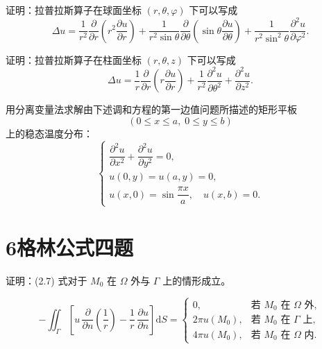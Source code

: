 \begin{homework}[2]
证明：拉普拉斯算子在球面坐标 $(r,\theta,\varphi)$ 下可以写成
\[
\Delta u
=\frac1{r^2}\frac{\partial}{\partial r}\!\left(r^2\frac{\partial u}{\partial r}\right)
+\frac1{r^2\sin\theta}\frac{\partial}{\partial\theta}\!\left(\sin\theta\frac{\partial u}{\partial\theta}\right)
+\frac1{r^2\sin^2\theta}\frac{\partial^2 u}{\partial\varphi^2}.
\]
\end{homework}


\begin{homework}[3]
证明：拉普拉斯算子在柱面坐标 $(r,\theta,z)$ 下可以写成
\[
\Delta u
=\frac1r\frac{\partial}{\partial r}\!\left(r\frac{\partial u}{\partial r}\right)
+\frac1{r^2}\frac{\partial^2 u}{\partial\theta^2}
+\frac{\partial^2 u}{\partial z^2}.
\]
\end{homework}


\begin{homework}[6]
用分离变量法求解由下述调和方程的第一边值问题所描述的矩形平板
\[
(0\le x\le a,\;0\le y\le b)
\]
上的稳态温度分布：
\[
\begin{cases}
\dfrac{\partial^2 u}{\partial x^2}
+\dfrac{\partial^2 u}{\partial y^2}=0,\\[0.6em]
u(0,y)=u(a,y)=0,\\[0.4em]
u(x,0)=\sin\dfrac{\pi x}{a},\quad u(x,b)=0.
\end{cases}
\]
\end{homework}


\section{6格林公式四题}
\begin{homework}[1]
证明：(2.7) 式对于 $M_0$ 在 $\Omega$ 外与 $\Gamma$ 上的情形成立。
\end{homework}
\begin{equation}\tag{2.7}\label{eq:2.7}
 - \iint_{\Gamma}
 \left[
   u\,\frac{\partial}{\partial n}\!\left(\frac{1}{r}\right)
   - \frac{1}{r}\,\frac{\partial u}{\partial n}
 \right]\mathrm{d}S
 =
 \begin{cases}
   0, & \text{若 } M_0 \text{ 在 } \Omega \text{ 外},\\[4pt]
   2\pi u(M_0), & \text{若 } M_0 \text{ 在 } \Gamma \text{ 上},\\[4pt]
   4\pi u(M_0), & \text{若 } M_0 \text{ 在 } \Omega \text{ 内}.
 \end{cases}
\end{equation}




